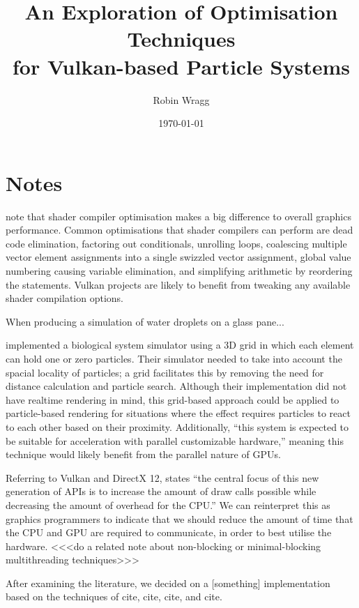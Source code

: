 \documentclass[11pt, a4paper, twocolumn]{article}
\title{\sffamily\bfseries An Exploration of Optimisation Techniques\\for Vulkan-based Particle Systems}
\author{Robin Wragg}
\date{\today}
\begin{document}
\maketitle






\section{Notes}
\citet{Crawford2018} note that shader compiler optimisation makes a big difference to overall graphics performance. Common optimisations that shader compilers can perform are dead code elimination, factoring out conditionals, unrolling loops, coalescing multiple vector element assignments into a single swizzled vector assignment, global value numbering causing variable elimination, and simplifying arithmetic by reordering the statements. Vulkan projects are likely to benefit from tweaking any available shader compilation options.

When producing a simulation of water droplets on a glass pane... \citet{Chen2012}

\citet{Boulianne2007} implemented a biological system simulator using a 3D grid in which each element can hold one or zero particles. Their simulator needed to take into account the spacial locality of particles; a grid facilitates this by removing the need for distance calculation and particle search. Although their implementation did not have realtime rendering in mind, this grid-based approach could be applied to particle-based rendering for situations where the effect requires particles to react to each other based on their proximity. Additionally, ``this system is expected to be suitable for acceleration with parallel customizable hardware,'' \citep{Boulianne2007} meaning this technique would likely benefit from the parallel nature of GPUs.



Referring to Vulkan and DirectX 12, \citet{Joseph2016} states ``the central focus of this new generation of APIs is to increase the amount of draw calls possible while decreasing the amount of overhead for the CPU.'' We can reinterpret this as graphics programmers to indicate that we should reduce the amount of time that the CPU and GPU are required to communicate, in order to best utilise the hardware. <<<do a related note about non-blocking or minimal-blocking multithreading techniques>>>




After examining the literature, we decided on a [something] implementation based on the techniques of cite, cite, cite, and cite.






\end{document}
